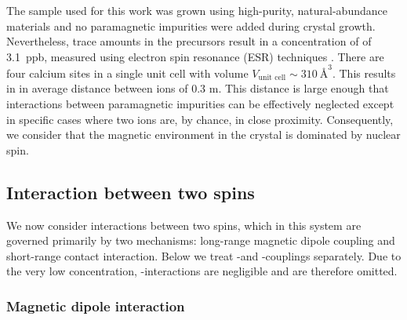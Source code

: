 The sample used for this work was grown using high-purity, natural-abundance materials and no paramagnetic impurities were added during crystal growth. Nevertheless, trace amounts in the precursors result in a concentration of \Er of 3.1~ppb, measured using electron spin resonance (ESR) techniques . There are four calcium sites in a single unit cell with volume $V_{\text{unit cell}}\sim310\ \text{\AA}^3$. This results in in average distance between ions of 0.3 \textmu m.  
This distance is large enough that interactions between paramagnetic impurities can be effectively neglected except in specific cases where two ions are, by chance, in close proximity. Consequently, we consider that the magnetic environment in the crystal is dominated by \W nuclear spin.

\subsection{Interaction between two spins}

We now consider interactions between two spins, which in this system are governed primarily by two mechanisms: long-range magnetic dipole coupling and short-range contact interaction. Below we treat \Er-\W and \W-\W couplings separately. Due to the very low \Er concentration, \Er-\Er interactions are negligible and are therefore omitted.

\subsubsection{Magnetic dipole interaction}

